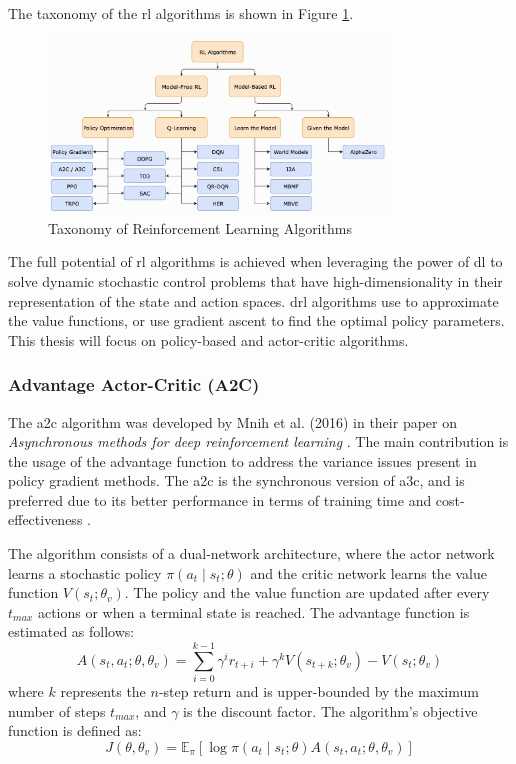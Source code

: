 The taxonomy of the \acrshort{rl} algorithms is shown in Figure \ref{fig:rl_taxonomy}.
\begin{figure}[h]
    \centering
    \includegraphics[width=0.8\textwidth]{figures/rl-taxonomy.png}
    \caption{Taxonomy of Reinforcement Learning Algorithms \cite{Achiam2018}}
    \label{fig:rl_taxonomy}
\end{figure}

The full potential of \acrshort{rl} algorithms is achieved when leveraging the power of \acrlong{dl} to solve dynamic stochastic control problems that have high-dimensionality in their representation of the state and action spaces. \acrshort{drl} algorithms use  to approximate the value functions, or use gradient ascent to find the optimal policy parameters. This thesis will focus on policy-based and actor-critic algorithms.

\subsubsection{Advantage Actor-Critic (A2C)} \label{sec:a2c}

The \acrfull{a2c} algorithm was developed by Mnih et al. (2016) in their paper on \textit{Asynchronous methods for deep reinforcement learning} \cite{Mnih2016}. The main contribution is the usage of the advantage function to address the variance issues present in policy gradient methods. The \acrshort{a2c} is the synchronous version of \acrshort{a3c}, and is preferred due to its better performance in terms of training time and cost-effectiveness \cite{Wu2017}.

The algorithm consists of a dual-network architecture, where the actor network learns a stochastic policy $\pi\left(a_t\mid s_t; \theta\right)$ and the critic network learns the value function $V\left(s_t; \theta_v\right)$. The policy and the value function are updated after every $t_{max}$ actions or when a terminal state is reached. The advantage function is estimated as follows: 
\begin{equation}
    A\left(s_t, a_t; \theta, \theta_v\right) = \sum_{i=0}^{k-1} \gamma^i r_{t+i} + \gamma^k V\left(s_{t+k}; \theta_v\right) - V\left(s_t; \theta_v\right)
\end{equation}
where $k$ represents the $n$-step return and is upper-bounded by the maximum number of steps $t_{max}$, and $\gamma$ is the discount factor. The algorithm's objective function is defined as:
\begin{equation}
    J\left(\theta, \theta_v\right) = \mathbb{E}_{\pi}\left[\log \pi\left(a_t\mid s_t; \theta\right) A\left(s_t, a_t; \theta, \theta_v\right)\right]
\end{equation}

